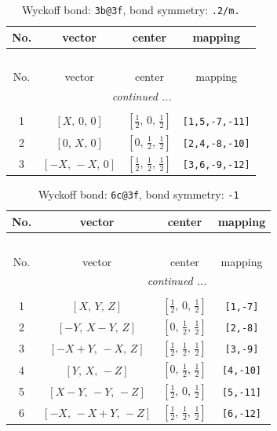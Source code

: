 \documentclass[fleqn,8pt]{jsarticle}
\begin{document}
\renewcommand{\arraystretch}{1.2}
\begin{longtable}{cccc}
\caption{Wyckoff bond: {\tt 3b@3f}, bond symmetry: {\tt .2/m.}}
 \\
 \hline \hline
No. & vector & center & mapping \\ \hline \endfirsthead

\multicolumn{3}{l}{\tablename\ \thetable{}} \\
 \hline \hline
No. & vector & center & mapping \\ \hline \endhead

 \hline \hline
\multicolumn{3}{r}{\footnotesize\it continued ...} \\ \endfoot

 \hline \hline
\multicolumn{3}{r}{} \\ \endlastfoot

1 & $\left[ X,\, 0,\, 0 \right]$ & $\left[ \frac{1}{2},\, 0,\, \frac{1}{2} \right]$ & {\tt [1,5,-7,-11]} \\ \hline
2 & $\left[ 0,\, X,\, 0 \right]$ & $\left[ 0,\, \frac{1}{2},\, \frac{1}{2} \right]$ & {\tt [2,4,-8,-10]} \\ \hline
3 & $\left[ - X,\, - X,\, 0 \right]$ & $\left[ \frac{1}{2},\, \frac{1}{2},\, \frac{1}{2} \right]$ & {\tt [3,6,-9,-12]} \\
\end{longtable}
\renewcommand{\arraystretch}{1.2}
\begin{longtable}{cccc}
\caption{Wyckoff bond: {\tt 6c@3f}, bond symmetry: {\tt -1}}
 \\
 \hline \hline
No. & vector & center & mapping \\ \hline \endfirsthead

\multicolumn{3}{l}{\tablename\ \thetable{}} \\
 \hline \hline
No. & vector & center & mapping \\ \hline \endhead

 \hline \hline
\multicolumn{3}{r}{\footnotesize\it continued ...} \\ \endfoot

 \hline \hline
\multicolumn{3}{r}{} \\ \endlastfoot

1 & $\left[ X,\, Y,\, Z \right]$ & $\left[ \frac{1}{2},\, 0,\, \frac{1}{2} \right]$ & {\tt [1,-7]} \\ \hline
2 & $\left[ - Y,\, X - Y,\, Z \right]$ & $\left[ 0,\, \frac{1}{2},\, \frac{1}{2} \right]$ & {\tt [2,-8]} \\ \hline
3 & $\left[ - X + Y,\, - X,\, Z \right]$ & $\left[ \frac{1}{2},\, \frac{1}{2},\, \frac{1}{2} \right]$ & {\tt [3,-9]} \\ \hline
4 & $\left[ Y,\, X,\, - Z \right]$ & $\left[ 0,\, \frac{1}{2},\, \frac{1}{2} \right]$ & {\tt [4,-10]} \\ \hline
5 & $\left[ X - Y,\, - Y,\, - Z \right]$ & $\left[ \frac{1}{2},\, 0,\, \frac{1}{2} \right]$ & {\tt [5,-11]} \\ \hline
6 & $\left[ - X,\, - X + Y,\, - Z \right]$ & $\left[ \frac{1}{2},\, \frac{1}{2},\, \frac{1}{2} \right]$ & {\tt [6,-12]} \\
\end{longtable}
\end{document}
